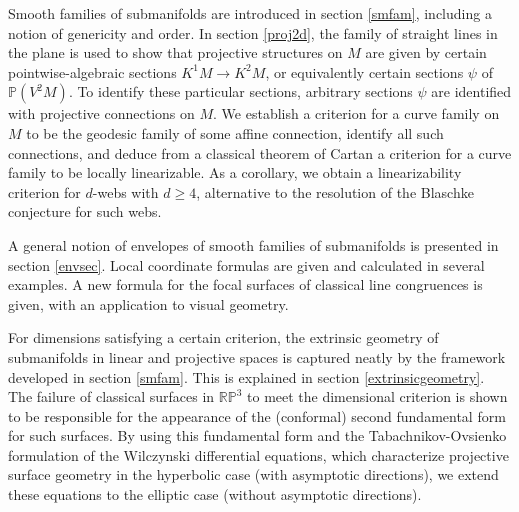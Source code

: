 \documentclass[12pt]{article}
\numberwithin{equation}{section}
\theoremstyle{plain}
\theoremstyle{definition}
\renewcommand{\P}{\mathbb{P}}
\renewcommand{\L}{\Lambda}
\newcommand{\RP}{\mathbb{RP}}
\newcommand{\ra}{\rightarrow}
\begin{document}







Smooth families of submanifolds are introduced in section \ref{smfam}, including a notion of genericity and order. In section \ref{proj2d}, the family of straight lines in the plane is used to show that projective structures on $M$ are given by certain pointwise-algebraic sections $K^{1}M\ra K^{2}M$, or equivalently certain sections $\psi$ of $\P(V^{2}M)$. To identify these particular sections, arbitrary sections $\psi$ are identified with projective connections on $M$. We establish a criterion for a curve family on $M$ to be the geodesic family of some affine connection, identify all such connections, and deduce from a classical theorem of Cartan a criterion for a curve family to be locally linearizable. As a corollary, we obtain a linearizability criterion for $d$-webs with $d\geq 4$, alternative to the resolution \cite{lychagin4webs} of the Blaschke conjecture for such webs.

A general notion of envelopes of smooth families of submanifolds is presented in section \ref{envsec}. Local coordinate formulas are given and calculated in several examples. A new formula for the focal surfaces of classical line congruences is given, with an application to visual geometry.

For dimensions satisfying a certain criterion, the extrinsic geometry of submanifolds in linear and projective spaces is captured neatly by the framework developed in section \ref{smfam}. This is explained in section \ref{extrinsicgeometry}. The failure of classical surfaces in $\RP^{3}$ to meet the dimensional criterion is shown to be responsible for the appearance of the (conformal) second fundamental form for such surfaces. By using this fundamental form and the Tabachnikov-Ovsienko \cite{to} formulation of the Wilczynski differential equations, which characterize projective surface geometry in the hyperbolic case (with asymptotic directions), we extend these equations to the elliptic case (without asymptotic directions).
\end{document}
